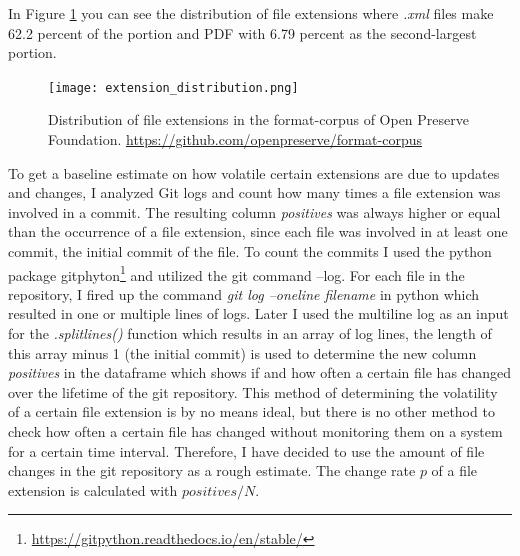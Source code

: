 In Figure \ref{fig:extension_distribution} you can see the distribution of file extensions where \textit{.xml} files make 62.2 percent of the portion and PDF with 6.79 percent as the second-largest portion.
\begin{figure}[t]
    \centering
    \texttt{[image: extension\_distribution.png]}
    \caption{Distribution of file extensions in the format-corpus of Open Preserve Foundation. \url{https://github.com/openpreserve/format-corpus}}
    \label{fig:extension_distribution}
\end{figure}
To get a baseline estimate on how volatile certain extensions are due to updates and changes, I analyzed Git logs and count how many times a file extension was involved in a commit. The resulting column \textit{positives} was always higher or equal than the occurrence of a file extension, since each file was involved in at least one commit, the initial commit of the file. To count the commits I used the python package gitphyton\footnote{\url{https://gitpython.readthedocs.io/en/stable/}} and utilized the git command --log. For each file in the repository, I fired up the command \textit{git log --oneline filename} in python which resulted in one or multiple lines of logs. Later I used the multiline log as an input for the \textit{.splitlines()} function which results in an array of log lines, the length of this array minus 1 (the initial commit) is used to determine the new column \textit{positives} in the dataframe which shows if and how often a certain file has changed over the lifetime of the git repository. 
This method of determining the volatility of a certain file extension is by no means ideal, but there is no other method to check how often a certain file has changed without monitoring them on a system for a certain time interval. Therefore, I have decided to use the amount of file changes in the git repository as a rough estimate.
The change rate $p$ of a file extension is calculated with $positives/N$.
